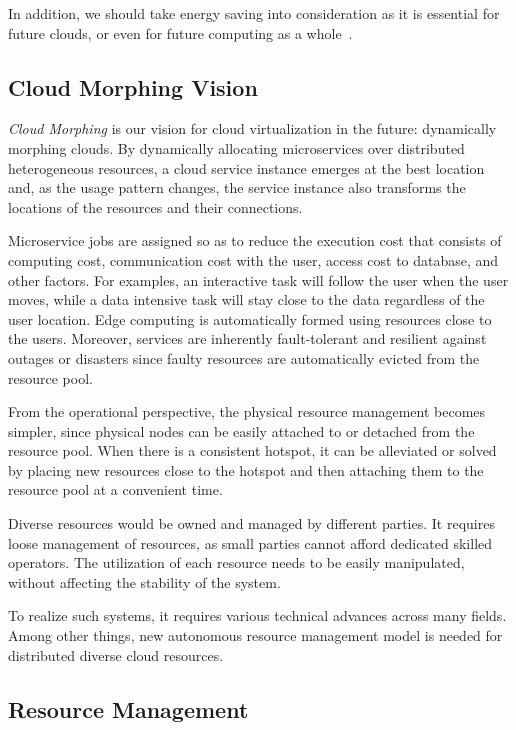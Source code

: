 In addition, we should take energy saving into consideration as it is
essential for future clouds, or even for future computing as a
whole~\cite{Mastelic-2015,masanet2020recalibrating}.

\subsection{Cloud Morphing Vision}

{\em Cloud Morphing} is our vision for cloud virtualization in the future:
dynamically morphing clouds.
By dynamically allocating microservices over distributed
heterogeneous resources, a cloud service instance emerges at the best
location and, as the usage pattern changes, the service instance also
transforms the locations of the resources and their connections.

Microservice jobs are assigned so as to reduce the execution cost that
consists of computing cost, communication cost with the user, access
cost to database, and other factors.
For examples, an interactive task will follow the user when the user
moves, while a data intensive task will stay close to the data
regardless of the user location.
Edge computing is automatically formed using resources close to
the users.
Moreover, services are inherently fault-tolerant and resilient
against outages or disasters since faulty resources are
automatically evicted from the resource pool.

From the operational perspective, the physical resource management
becomes simpler, since physical nodes can be easily attached to or
detached from the resource pool.
When there is a consistent hotspot, it can be alleviated or solved by
placing new resources close to the hotspot and then attaching them to
the resource pool at a convenient time.

Diverse resources would be owned and managed by different parties.
It requires loose management of resources, as small parties cannot
afford dedicated skilled operators.
The utilization of each resource needs to be easily manipulated,
without affecting the stability of the system.

To realize such systems, it requires various technical advances across
many fields.  Among other things, new autonomous resource management
model is needed for distributed diverse cloud resources.

\subsection{Resource Management}

